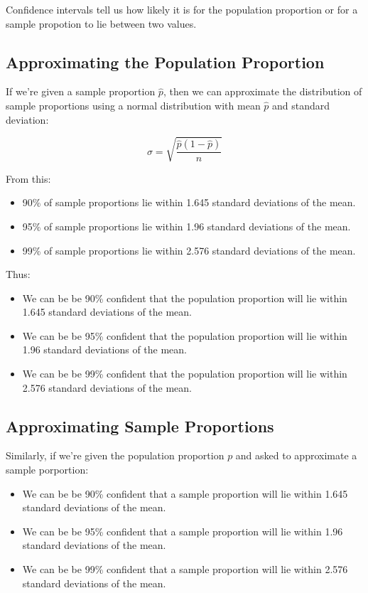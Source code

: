 \documentclass[a4paper,11pt]{article}
\begin{document}
Confidence intervals tell us how likely it is for the population proportion or
for a sample propotion to lie between two values.

\subsection{Approximating the Population Proportion}

If we're given a sample proportion $\hat{p}$, then we can approximate the
distribution of sample proportions using a normal distribution with mean
$\hat{p}$ and standard deviation:

$$
\sigma = \sqrt{\frac{\hat{p}(1 - \hat{p})}{n}}
$$

From this:

\begin{itemize}
\item 90\% of sample proportions lie within 1.645 standard deviations of the
	mean.
\item 95\% of sample proportions lie within 1.96 standard deviations of the
	mean.
\item 99\% of sample proportions lie within 2.576 standard deviations of the
	mean.
\end{itemize}

Thus:

\begin{itemize}
\item We can be be 90\% confident that the population proportion will lie within
	1.645 standard deviations of the mean.
\item We can be be 95\% confident that the population proportion will lie within
	1.96 standard deviations of the mean.
\item We can be be 99\% confident that the population proportion will lie within
	2.576 standard deviations of the mean.
\end{itemize}

\subsection{Approximating Sample Proportions}

Similarly, if we're given the population proportion $p$ and asked to approximate
a sample porportion:

\begin{itemize}
\item We can be be 90\% confident that a sample proportion will lie within
	1.645 standard deviations of the mean.
\item We can be be 95\% confident that a sample proportion will lie within
	1.96 standard deviations of the mean.
\item We can be be 99\% confident that a sample proportion will lie within
	2.576 standard deviations of the mean.
\end{itemize}
\end{document}

